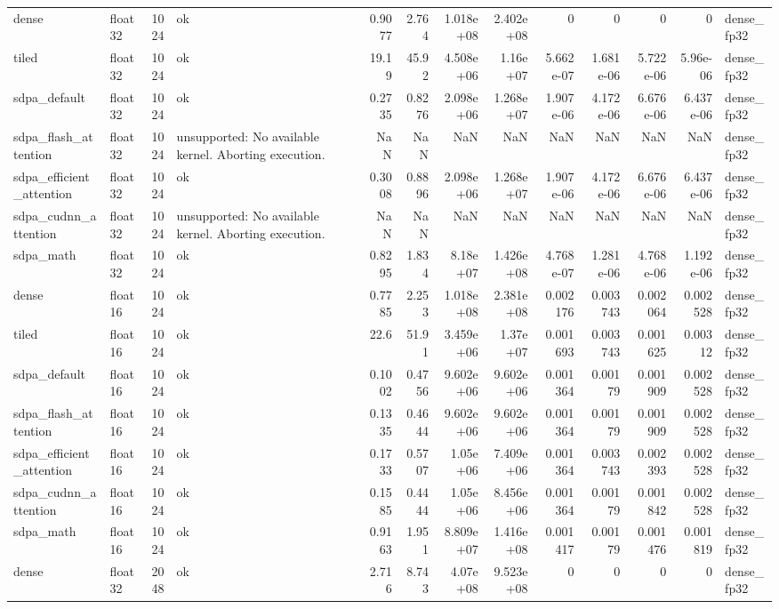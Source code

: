 \begin{table}
\begin{tabular}{llrlrrrrrrrrl}
dense & float32 & 1024 & ok & 0.9077 & 2.764 & 1.018e+08 & 2.402e+08 & 0 & 0 & 0 & 0 & dense\_fp32 \\
tiled & float32 & 1024 & ok & 19.19 & 45.92 & 4.508e+06 & 1.16e+07 & 5.662e-07 & 1.681e-06 & 5.722e-06 & 5.96e-06 & dense\_fp32 \\
sdpa\_default & float32 & 1024 & ok & 0.2735 & 0.8276 & 2.098e+06 & 1.268e+07 & 1.907e-06 & 4.172e-06 & 6.676e-06 & 6.437e-06 & dense\_fp32 \\
sdpa\_flash\_attention & float32 & 1024 & unsupported: No available kernel. Aborting execution. & NaN & NaN & NaN & NaN & NaN & NaN & NaN & NaN & dense\_fp32 \\
sdpa\_efficient\_attention & float32 & 1024 & ok & 0.3008 & 0.8896 & 2.098e+06 & 1.268e+07 & 1.907e-06 & 4.172e-06 & 6.676e-06 & 6.437e-06 & dense\_fp32 \\
sdpa\_cudnn\_attention & float32 & 1024 & unsupported: No available kernel. Aborting execution. & NaN & NaN & NaN & NaN & NaN & NaN & NaN & NaN & dense\_fp32 \\
sdpa\_math & float32 & 1024 & ok & 0.8295 & 1.834 & 8.18e+07 & 1.426e+08 & 4.768e-07 & 1.281e-06 & 4.768e-06 & 1.192e-06 & dense\_fp32 \\
dense & float16 & 1024 & ok & 0.7785 & 2.253 & 1.018e+08 & 2.381e+08 & 0.002176 & 0.003743 & 0.002064 & 0.002528 & dense\_fp32 \\
tiled & float16 & 1024 & ok & 22.6 & 51.91 & 3.459e+06 & 1.37e+07 & 0.001693 & 0.003743 & 0.001625 & 0.00312 & dense\_fp32 \\
sdpa\_default & float16 & 1024 & ok & 0.1002 & 0.4756 & 9.602e+06 & 9.602e+06 & 0.001364 & 0.00179 & 0.001909 & 0.002528 & dense\_fp32 \\
sdpa\_flash\_attention & float16 & 1024 & ok & 0.1335 & 0.4644 & 9.602e+06 & 9.602e+06 & 0.001364 & 0.00179 & 0.001909 & 0.002528 & dense\_fp32 \\
sdpa\_efficient\_attention & float16 & 1024 & ok & 0.1733 & 0.5707 & 1.05e+06 & 7.409e+06 & 0.001364 & 0.003743 & 0.002393 & 0.002528 & dense\_fp32 \\
sdpa\_cudnn\_attention & float16 & 1024 & ok & 0.1585 & 0.4444 & 1.05e+06 & 8.456e+06 & 0.001364 & 0.00179 & 0.001842 & 0.002528 & dense\_fp32 \\
sdpa\_math & float16 & 1024 & ok & 0.9163 & 1.951 & 8.809e+07 & 1.416e+08 & 0.001417 & 0.00179 & 0.001476 & 0.001819 & dense\_fp32 \\
dense & float32 & 2048 & ok & 2.716 & 8.743 & 4.07e+08 & 9.523e+08 & 0 & 0 & 0 & 0 & dense\_fp32 \\

\end{tabular}
\end{table}
